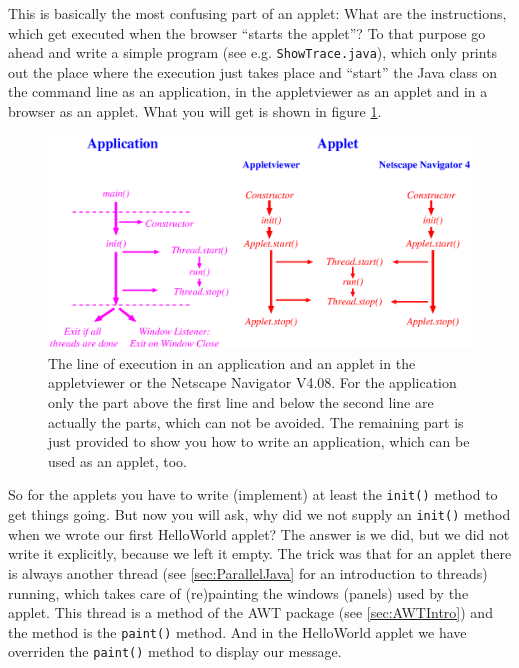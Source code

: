 This is basically the most confusing part of an applet: What are the
instructions, which get executed when the browser ``starts the applet''?
To that purpose go ahead and write a simple program 
(see e.g. \verb|ShowTrace.java|), which only 
prints out the place where the execution just takes place and ``start''
the Java class on the command line as an application, in the appletviewer
as an applet and in a browser as an applet. What you will get is shown
in figure \ref{fig:LineOfExecution}.
\begin{figure}[htbp]
  \begin{center}
    \leavevmode
    \includegraphics[width=\textwidth]{Figures/LineOfExecution.eps}
    \caption{The line of execution in an application and an applet in
        the appletviewer or the Netscape Navigator V4.08. For the application
        only the part above the first line and below the second line are
        actually the parts, which can not be avoided. The remaining
        part is just provided to show you how to write an application,
        which can be used as an applet, too.}
    \label{fig:LineOfExecution}
  \end{center}
\end{figure}

So for the applets you have to write (implement) at least the 
\verb|init()| method to get things going. But now you will ask, why did we
not supply an  \verb|init()| method when we wrote our first 
HelloWorld applet? The answer is we did, but we did not write it explicitly,
because we left it empty. The trick was that for an applet there is
always another thread (see \ref{sec:ParallelJava} for an introduction to threads)
running, which takes care of (re)painting the windows (panels) used by the applet.
This thread is a method of the AWT package (see \ref{sec:AWTIntro}) and
the method is the \verb|paint()| method. And in the    HelloWorld applet
we have overriden the \verb|paint()| method to display our message.

